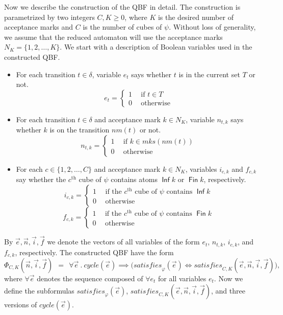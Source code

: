\documentclass[a4paper,UKenglish,cleveref,autoref,thm-restate]{lipics-v2021}
\DeclareMathOperator{\Inf}{\mathsf{Inf}}
\DeclareMathOperator{\Fin}{\mathsf{Fin}}
\newcommand{\mks}{\mathit{mks}}
\newcommand{\rem}{\mathit{nm}}
\newcommand{\mcycle}{\mathit{cycle}}
\newcommand{\msat}{\mathit{satisfies}}
\begin{document}
Now we describe the construction of the QBF in detail. The
construction is parametrized by two integers $C,K\ge 0$, where $K$ is
the desired number of acceptance marks and $C$ is the number of cubes
of $\psi$. Without loss of generality, we assume that the reduced
automaton will use the acceptance marks $N_K=\{1,2,\ldots,K\}$.
We start with a description of Boolean variables used in the
constructed QBF.
\begin{itemize}
\item For each transition $t\in\delta$, variable $e_t$ says whether
  $t$ is in the current set $T$ or not.
  \[e_t=\left\{
      \begin{array}{ll}
        1~~ & \textrm{if }t\in T\\[.5ex]
        0 & \textrm{otherwise}    
      \end{array}\right.
  \]
\item For each transition $t\in\delta$ and acceptance mark $k\in N_K$,
  variable $n_{t,k}$ says whether $k$ is on the transition
  $\rem(t)$ or not.
  \[n_{t,k}=\left\{
      \begin{array}{ll}
        1~~ & \textrm{if }k\in\mks(\rem(t))\\[.5ex]
        0 & \textrm{otherwise}    
      \end{array}\right.
  \]
\item For each $c\in\{1,2,\ldots,C\}$ and acceptance mark $k\in N_K$,
  variables $i_{c,k}$ and $f_{c,k}$ say whether the $c^\textrm{th}$
  cube of $\psi$ contains atoms $\Inf k$ or $\Fin k$, respectively.
  \[i_{c,k}=\left\{
      \begin{array}{ll}
        1~~ & \textrm{if the $c^\textrm{th}$ cube of $\psi$ contains $\Inf k$}\\[.5ex]
        0 & \textrm{otherwise}    
      \end{array}\right.
  \]
  \[f_{c,k}=\left\{
      \begin{array}{ll}
        1~~ & \textrm{if the $c^\textrm{th}$ cube of $\psi$ contains $\Fin k$}\\[.5ex]
        0 & \textrm{otherwise}    
      \end{array}\right.
  \]

\end{itemize}
By $\vec{e},\vec{n},\vec{i},\vec{f}$ we denote the vectors of all
variables of the form $e_t$, $n_{t,k}$, $i_{c,k}$, and $f_{c,k}$,
respectively. The constructed QBF have the form
\[
  \Phi_{C,K}(\vec{n},\vec{i},\vec{f})~~=~~\forall \vec{e}~.~\mcycle(\vec{e})\implies\big(\msat_\varphi(\vec{e}) \iff \msat_{C,K}(\vec{e},\vec{n},\vec{i},\vec{f})\big),
\]
where $\forall\vec{e}$ denotes the sequence composed of $\forall e_t$
for all variables $e_t$. Now we define the subformulas
$\msat_\varphi(\vec{e})$,
$\msat_{C,K}(\vec{e},\vec{n},\vec{i},\vec{f})$, and three versions of
$\mcycle(\vec{e})$.
\end{document}
